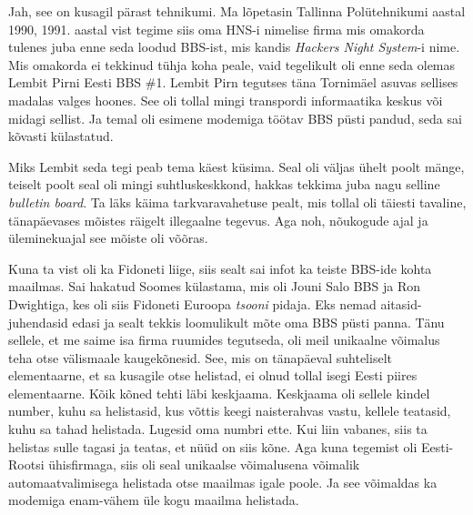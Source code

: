 
Jah, see on kusagil pärast tehnikumi. Ma lõpetasin Tallinna Polütehnikumi aastal 1990, 1991. aastal vist tegime siis oma HNS-i nimelise firma mis omakorda tulenes juba enne seda loodud BBS-ist, mis kandis \emph{Hackers Night System}-i nime. Mis omakorda ei tekkinud tühja koha peale, vaid tegelikult oli enne seda olemas Lembit Pirni Eesti BBS \#1. Lembit Pirn tegutses täna Tornimäel asuvas sellises madalas valges hoones. See oli tollal mingi transpordi informaatika keskus või midagi sellist. Ja temal oli esimene modemiga töötav BBS püsti pandud, seda sai kõvasti  külastatud. 


Miks Lembit seda tegi peab tema käest küsima. Seal oli väljas ühelt poolt mänge, teiselt poolt seal oli mingi suhtluskeskkond, hakkas tekkima juba nagu selline \emph{bulletin board}. Ta läks käima tarkvaravahetuse pealt, mis tollal oli täiesti tavaline, tänapäevases mõistes räigelt illegaalne tegevus. Aga noh, nõukogude ajal ja üleminekuajal see mõiste oli võõras. 

Kuna ta vist oli ka Fidoneti liige, siis sealt sai infot ka teiste BBS-ide kohta maailmas. Sai hakatud Soomes külastama, mis oli Jouni Salo BBS ja Ron Dwightiga, kes  oli siis Fidoneti Euroopa \emph{tsooni} pidaja. Eks nemad aitasid-juhendasid edasi ja sealt tekkis loomulikult mõte oma BBS püsti panna. Tänu sellele, et me saime isa firma ruumides tegutseda, oli meil unikaalne võimalus teha otse välismaale kaugekõnesid. See, mis on tänapäeval suhteliselt elementaarne, et sa kusagile otse helistad, ei olnud tollal isegi Eesti piires elementaarne. Kõik kõned tehti läbi keskjaama. Keskjaama oli  sellele kindel number, kuhu sa helistasid, kus võttis keegi naisterahvas vastu,  kellele  teatasid, kuhu sa tahad helistada. Lugesid oma numbri ette. Kui liin vabanes, siis ta  helistas sulle tagasi ja teatas, et nüüd on siis kõne. Aga kuna tegemist oli Eesti-Rootsi ühisfirmaga, siis oli seal unikaalse võimalusena võimalik automaatvalimisega helistada otse maailmas igale poole. Ja see võimaldas ka modemiga enam-vähem üle kogu maailma helistada.


